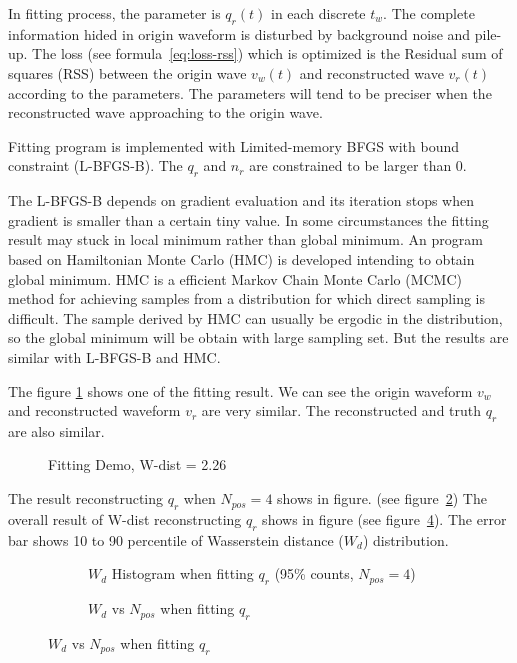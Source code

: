 In fitting process, the parameter is $q_{r}(t)$ in each discrete $t_{w}$. The complete information hided in origin waveform is disturbed by background noise and pile-up. The loss (see formula~\ref{eq:loss-rss}) which is optimized is the Residual sum of squares (RSS) between the origin wave $v_{w}(t)$ and reconstructed wave $v_{r}(t)$ according to the parameters. The parameters will tend to be preciser when the reconstructed wave approaching to the origin wave. 

Fitting program is implemented with Limited-memory BFGS with bound constraint\cite{byrd_limited_1995} (L-BFGS-B). The $q_{r}$ and $n_{r}$ are constrained to be larger than 0. 

The L-BFGS-B depends on gradient evaluation and its iteration stops when gradient is smaller than a certain tiny value. In some circumstances the fitting result may stuck in local minimum rather than global minimum. An program based on Hamiltonian Monte Carlo (HMC) is developed intending to obtain global minimum. HMC is a efficient Markov Chain Monte Carlo (MCMC) method for achieving samples from a distribution for which direct sampling is difficult\cite{neal_mcmc_2012}. The sample derived by HMC can usually be ergodic in the distribution, so the global minimum will be obtain with large sampling set. But the results are similar with L-BFGS-B and HMC. 

The figure \ref{fig:fitting} shows one of the fitting result. We can see the origin waveform $v_{w}$ and reconstructed waveform $v_{r}$ are very similar. The reconstructed and truth $q_{r}$ are also similar. 
\begin{figure}[H]
    \centering
    \scalebox{0.4}{}
    \caption{\label{fig:fitting} Fitting Demo, W-dist = 2.26}
\end{figure}

The result reconstructing $q_{r}$ when $N_{pos}=4$ shows in figure. (see figure~\ref{fig:fitting-hist}) The overall result of W-dist reconstructing $q_{r}$ shows in figure (see figure~\ref{fig:fitting-npos}). The error bar shows 10 to 90 percentile of Wasserstein distance ($W_{d}$) distribution. 

\begin{figure}[H]
\begin{minipage}[t]{.5\textwidth}
\begin{figure}[H]
    \centering
    \resizebox{\textwidth}{!}{}
    \caption{\label{fig:fitting-hist} $W_{d}$ Histogram when fitting $q_{r}$ (95\% counts, $N_{pos}=4$)}
\end{figure}
\end{minipage}
\begin{minipage}[t]{.5\textwidth}
\begin{figure}[H]
    \centering
    \resizebox{\textwidth}{!}{}
    \caption{\label{fig:fitting-npos} $W_{d}$ vs $N_{pos}$ when fitting $q_{r}$}
\end{figure}
\end{minipage}
\end{figure}

